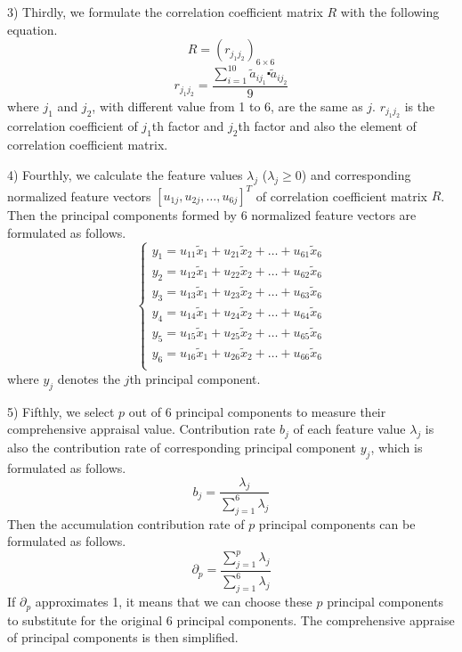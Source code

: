 \documentclass{apmcmthesis}
\begin{document}
3) Thirdly, we formulate the correlation coefficient matrix $R$ with the following equation.
\begin{equation}
R=({{r}_{{{j}_{1}}{{j}_{2}}}})_{6\times 6}
\end{equation}
\begin{equation}
{{r}_{{{j}_{1}}{{j}_{2}}}}=\frac{\sum\limits_{i=1}^{10}{{{{\tilde{a}}}_{i{{j}_{1}}}}}\centerdot {{{\tilde{a}}}_{i{{j}_{2}}}}}{9}
\end{equation}
where $j_1$ and $j_2$, with different value from 1 to 6, are the same as $j$. ${{r}_{{{j}_{1}}{{j}_{2}}}}$ is the correlation coefficient of $j_1$th factor and $j_2$th factor and also the element of correlation coefficient matrix.

4) Fourthly, we calculate the feature values $\lambda_j$ (${\lambda_j}\ge0$) and corresponding normalized feature vectors ${{[{{u}_{1j}},{{u}_{2j}},\ldots ,{{u}_{6j}}]}^{T}}$ of correlation coefficient matrix $R$. Then the principal components formed by 6 normalized feature vectors are formulated as follows.
\begin{equation}
\left\{ \begin{array}{*{35}{l}}
   {{y}_{1}}={{u}_{11}}{{{\tilde{x}}}_{1}}+{{u}_{21}}{{{\tilde{x}}}_{2}}+\ldots +{{u}_{61}}{{{\tilde{x}}}_{6}}  \\
   {{y}_{2}}={{u}_{12}}{{{\tilde{x}}}_{1}}+{{u}_{22}}{{{\tilde{x}}}_{2}}+\ldots +{{u}_{62}}{{{\tilde{x}}}_{6}}  \\
   {{y}_{3}}={{u}_{13}}{{{\tilde{x}}}_{1}}+{{u}_{23}}{{{\tilde{x}}}_{2}}+\ldots +{{u}_{63}}{{{\tilde{x}}}_{6}}  \\
   {{y}_{4}}={{u}_{14}}{{{\tilde{x}}}_{1}}+{{u}_{24}}{{{\tilde{x}}}_{2}}+\ldots +{{u}_{64}}{{{\tilde{x}}}_{6}}  \\
   {{y}_{5}}={{u}_{15}}{{{\tilde{x}}}_{1}}+{{u}_{25}}{{{\tilde{x}}}_{2}}+\ldots +{{u}_{65}}{{{\tilde{x}}}_{6}}  \\
   {{y}_{6}}={{u}_{16}}{{{\tilde{x}}}_{1}}+{{u}_{26}}{{{\tilde{x}}}_{2}}+\ldots +{{u}_{66}}{{{\tilde{x}}}_{6}}  \\
\end{array} \right.
\end{equation}
where $y_j$ denotes the $j$th principal component.

5) Fifthly, we select $p$ out of 6 principal components to measure their comprehensive appraisal value. Contribution rate $b_j$ of each feature value $\lambda_j$ is also the contribution rate of corresponding principal component $y_j$, which is formulated as follows.
\begin{equation}
{{b}_{j}}=\frac{{{\lambda }_{j}}}{\sum\limits_{j=1}^{6}{{{\lambda }_{j}}}}
\end{equation}
Then the accumulation contribution rate of $p$ principal components can be formulated as follows.
\begin{equation}
{{\partial }_{p}}=\frac{\sum\limits_{j=1}^{p}{{{\lambda }_{j}}}}{\sum\limits_{j=1}^{6}{{{\lambda }_{j}}}}
\end{equation}
If $\partial_p$ approximates 1, it means that we can choose these $p$ principal components to substitute for the original 6 principal components. The comprehensive appraise of principal components is then simplified.
\end{document}
